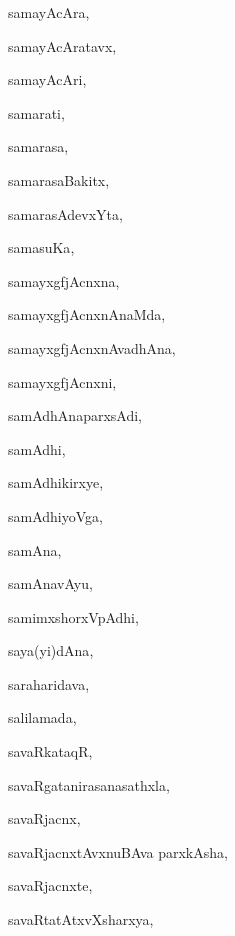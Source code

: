\begin{multicols}{3}
{\noindent
{samayAcAra}, \pageref{samayAcAra}

\noindent
{samayAcAratavx}, \pageref{samayAcAratavx}

\noindent
{samayAcAri}, \pageref{samayAcAri}

\noindent
{samarati}, \pageref{samarati}

\noindent
{samarasa}, \pageref{samarasa}

\noindent
{samarasaBakitx}, \pageref{samarasaBakitx}

\noindent
{samarasAdevxYta}, \pageref{samarasAdevxYta}

\noindent
{samasuKa}, \pageref{samasuKa}

\noindent
{samayxgfjAcnxna}, \pageref{samayxgfjAcnxna}

\noindent
{samayxgfjAcnxnAnaMda}, \pageref{samayxgfjAcnxnAnaMda}

\noindent
{samayxgfjAcnxnAvadhAna}, \pageref{samayxgfjAcnxnAvadhAna}

\noindent
{samayxgfjAcnxni}, \pageref{samayxgfjAcnxni}

\noindent
{samAdhAnaparxsAdi}, \pageref{samAdhAnaparxsAdi}

\noindent
{samAdhi}, \pageref{samAdhi}

\noindent
{samAdhikirxye}, \pageref{samAdhikirxye}

\noindent
{samAdhiyoVga}, \pageref{samAdhiyoVga}

\noindent
{samAna}, \pageref{samAna}

\noindent
{samAnavAyu}, \pageref{samAnavAyu}

\noindent
{samimxshorxVpAdhi}, \pageref{samimxshorxVpAdhi}

\noindent
{saya(yi)dAna}, \pageref{sayayidAna}

\noindent
{saraharidava}, \pageref{saraharidava}

\noindent
{salilamada}, \pageref{salilamada}

\noindent
{savaRkataqR}, \pageref{savaRkataqR}

\noindent
{savaRgatanirasanasathxla}, \pageref{savaRgatanirasanasathxla}

\noindent
{savaRjacnx}, \pageref{savaRjacnx}

\noindent
{savaRjacnxtAvxnuBAva parxkAsha}, \pageref{savaRjacnxtAvxnuBAvaparxkAsha}

\noindent
{savaRjacnxte}, \pageref{savaRjacnxte}

\noindent
{savaRtatAtxvXsharxya}, \pageref{savaRtatAtxvXsharxya}

}
\end{multicols}
